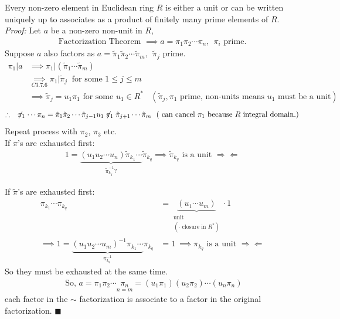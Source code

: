 \begin{theorem}
    Every non-zero element in Euclidean ring $R$ is either a unit or can be written uniquely up to
    associates as a product of finitely many prime elements of $R$. \\

    \noindent \textit{Proof: } Let $a$ be a non-zero non-unit in $R$,
    \begin{align*}
        \text{Factorization Theorem } \implies a=\pi_1 \pi_2 \cdots \pi_n, \ \ \pi_i \text{ prime}.
    \end{align*}
    Suppose $a$ also factors as
    $a= \tilde{\pi}_1 \tilde{\pi}_2 \cdots \tilde{\pi}_m,  \ \ \tilde{\pi}_j \text{ prime}$.
    \begin{align*}
        \pi_1| a &\implies \pi_1 | (\tilde{\pi}_1 \cdots \tilde{\pi}_m) \\
        &\underset{C3.7.6}{\implies} \pi_1 | \tilde{\pi}_j \ \text{ for some } 1\leq j \leq m \\
        &\implies \tilde{\pi}_j =u_1\pi_1 \text{ for some }u_1 \in R^* \ \ \ \ (\tilde{\pi}_j, \pi_1 \text{ prime, non-units means }u_1\text{ must be a unit})
    \end{align*}
    \begin{align*}
        \therefore \ \ \  \not \mathrel{\pi_1}\cdots \pi_n = \tilde{\pi}_1 \tilde{\pi}_2 \cdots \tilde{\pi}_{j-1} u_1 \not \mathrel{\pi_1} \tilde{\pi}_{j+1}\cdots \tilde{\pi}_m \ \ (\text{ can cancel }\pi_1 \text{ because }R\text{ integral domain.})
    \end{align*}
    Repeat process with $\pi_2$, $\pi_3$ etc. \\

    \noindent If $\pi$'s are exhausted first:
    \begin{align*}
        1=\underbrace{(u_1 u_2 \cdots u_n)\tilde{\pi}_{k_1}\cdots}_{\tilde{\pi}_{k_q}^{-1}?}\tilde{\pi}_{k_q} \implies \tilde{\pi}_{k_q} \text{ is a unit }\Rightarrow \Leftarrow
    \end{align*}

    \noindent If $\tilde{\pi}$'s are exhausted first:
    \begin{align*}
        \pi_{k_1}\cdots \pi_{k_q} &= \underbrace{(u_1\cdots u_m)}_{\substack{\text{unit }\\(\cdot \text{ closure in }R^*)}}\cdot 1 \\
        \implies 1=\underbrace{(u_1 u_2 \cdots u_m)^{-1}\pi_{k_1}\cdots}_{\pi_{k_q}^{-1}}\pi_{k_q}&= 1 \ \implies \pi_{k_q} \text{ is a unit }\Rightarrow\Leftarrow
    \end{align*}
    So they must be exhausted at the same time. \\

    \begin{align*}
        \text{ So, }a= \pi_1 \pi_2 \cdots \underset{n=m}{\pi_n} = (u_1\pi_1)(u_2 \pi_2)\cdots (u_n\pi_n)
    \end{align*}
    each factor in the $\sim$ factorization is associate to a factor in the original factorization.
    $\blacksquare$
\end{theorem}
